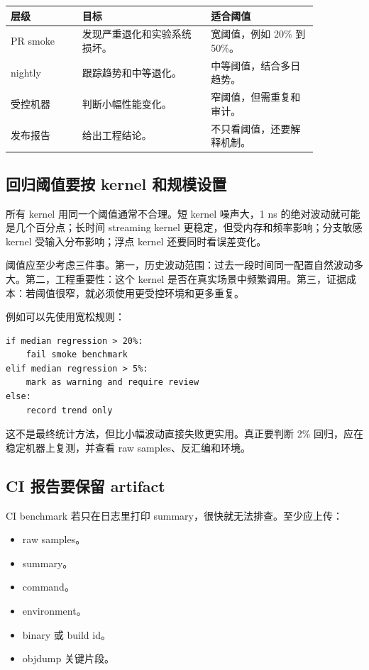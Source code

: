 \begin{center}
\begin{tabular}{p{0.20\linewidth}p{0.36\linewidth}p{0.30\linewidth}}
\toprule
层级 & 目标 & 适合阈值 \\
\midrule
PR smoke & 发现严重退化和实验系统损坏。 & 宽阈值，例如 20\% 到 50\%。 \\
nightly & 跟踪趋势和中等退化。 & 中等阈值，结合多日趋势。 \\
受控机器 & 判断小幅性能变化。 & 窄阈值，但需重复和审计。 \\
发布报告 & 给出工程结论。 & 不只看阈值，还要解释机制。 \\
\bottomrule
\end{tabular}
\end{center}

\subsection{回归阈值要按 kernel 和规模设置}

所有 kernel 用同一个阈值通常不合理。短 kernel 噪声大，1 ns 的绝对波动就可能是几个百分点；长时间 streaming kernel 更稳定，但受内存和频率影响；分支敏感 kernel 受输入分布影响；浮点 kernel 还要同时看误差变化。

阈值应至少考虑三件事。第一，历史波动范围：过去一段时间同一配置自然波动多大。第二，工程重要性：这个 kernel 是否在真实场景中频繁调用。第三，证据成本：若阈值很窄，就必须使用更受控环境和更多重复。

例如可以先使用宽松规则：

\begin{lstlisting}
if median regression > 20%:
    fail smoke benchmark
elif median regression > 5%:
    mark as warning and require review
else:
    record trend only
\end{lstlisting}

这不是最终统计方法，但比小幅波动直接失败更实用。真正要判断 2\% 回归，应在稳定机器上复测，并查看 raw samples、反汇编和环境。

\subsection{CI 报告要保留 artifact}

CI benchmark 若只在日志里打印 summary，很快就无法排查。至少应上传：

\begin{itemize}
  \item raw samples。
  \item summary。
  \item command。
  \item environment。
  \item binary 或 build id。
  \item objdump 关键片段。
\end{itemize}

